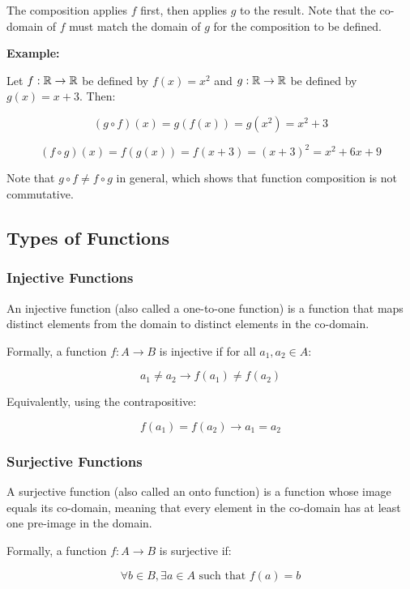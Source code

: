 The composition applies \(f\) first, then applies \(g\) to the result. 
Note that the co-domain of \(f\) must match the domain of \(g\) for the composition to be defined.
\vspace{\baselineskip}

\textbf{Example:}
\vspace{\baselineskip}

Let \(f: \mathbb{R} \to \mathbb{R}\) be defined by \(f(x) = x^2\) and \(g: \mathbb{R} \rightarrow \mathbb{R}\) be defined 
by \(g(x) = x+3\). Then:

\[
	(g \circ f)(x) = g(f(x)) = g(x^2) = x^2 + 3
\]

\[
	(f \circ g)(x) = f(g(x)) = f(x+3) = {(x+3)}^2 = x^2 + 6x + 9
\]

Note that \(g \circ f \neq f \circ g\) in general, which shows that function composition is not 
commutative.

\subsection{Types of Functions}

\subsubsection{Injective Functions}

An injective function (also called a one-to-one function) is a 
function that maps distinct elements from the domain to distinct elements in the co-domain.

Formally, a function \(f: A \to B\) is injective if for all \(a_1, a_2 \in A\):

\[
	a_1 \neq a_2 \to f(a_1) \neq f(a_2)
\]

Equivalently, using the contrapositive:

\[
	f(a_1) = f(a_2) \to a_1 = a_2
\]

\subsubsection{Surjective Functions}

A surjective function (also called an onto function) is a function whose image equals its co-domain, 
meaning that every element in the co-domain has at least one pre-image in the domain.

Formally, a function \(f: A \to B\) is surjective if:

\[
	\forall b \in B, \exists a \in A \text{ such that } f(a) = b
\]

